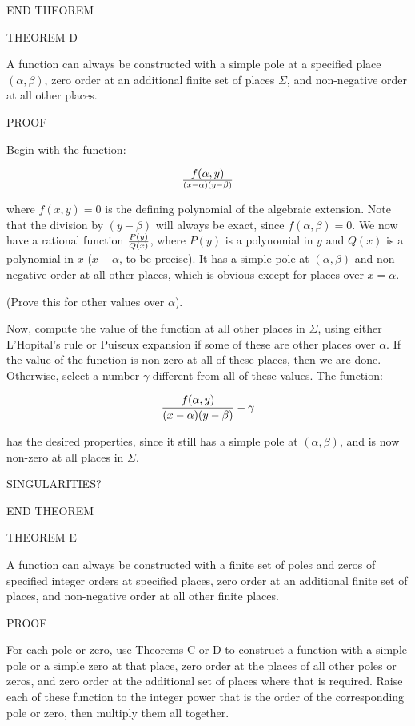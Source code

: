 END THEOREM

THEOREM D

A function can always be constructed with a simple pole at a specified
place $(\alpha, \beta)$, zero order at an additional finite set of
places $\Sigma$, and non-negative order at all other places.

PROOF

Begin with the function:

$$f(\alpha,y)\over(x-\alpha)(y-\beta)$$

where $f(x,y)=0$ is the defining polynomial of the algebraic extension.
Note that the division by $(y-\beta)$ will always be exact, since
$f(\alpha, \beta)=0$.  We now have a rational function
$P(y)\over Q(x)$, where $P(y)$ is a polynomial in $y$ and $Q(x)$ is a
polynomial in $x$ ($x-\alpha$, to be precise).  It has a simple pole at
$(\alpha, \beta)$ and non-negative order at all other places, which
is obvious except for places over $x=\alpha$.

(Prove this for other values over $\alpha$).

Now, compute the value of the function at all other places in
$\Sigma$, using either L'Hopital's rule or Puiseux expansion if some
of these are other places over $\alpha$.  If the value of the function
is non-zero at all of these places, then we are done.  Otherwise,
select a number $\gamma$ different from all of these values.  The
function:

$${f(\alpha,y)\over(x-\alpha)(y-\beta)} - \gamma$$

has the desired properties, since it still has a simple pole at
$(\alpha,\beta)$, and is now non-zero at all places in $\Sigma$.

SINGULARITIES?

END THEOREM

THEOREM E

A function can always be constructed with a finite set of poles and
zeros of specified integer orders at specified places, zero order at
an additional finite set of places, and non-negative order at all
other finite places.

PROOF

For each pole or zero, use Theorems C or D to construct a function
with a simple pole or a simple zero at that place, zero order at the
places of all other poles or zeros, and zero order at the additional
set of places where that is required.  Raise each of these function to
the integer power that is the order of the corresponding pole or zero,
then multiply them all together.

